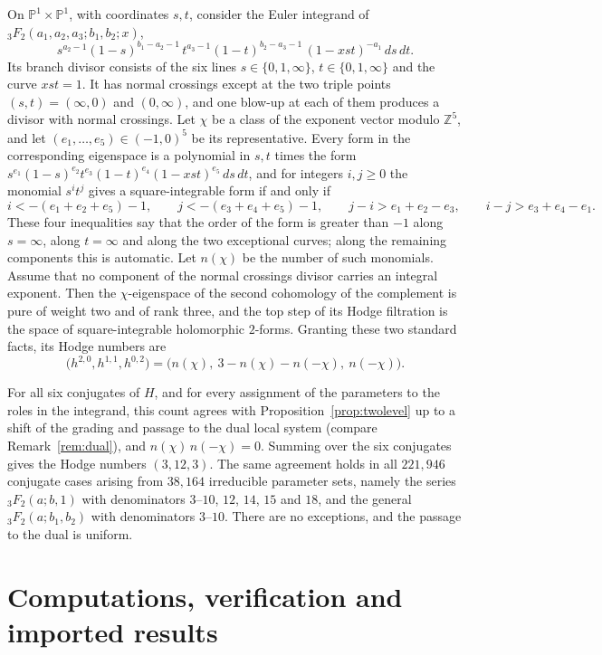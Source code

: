 \documentclass[11pt]{amsart}
\theoremstyle{definition}
\theoremstyle{remark}
\numberwithin{equation}{section}
\newcommand{\Z}{\mathbb{Z}}
\newcommand{\PP}{\mathbb{P}}
\begin{document}
On $\PP^1\times\PP^1$, with coordinates $s,t$, consider the Euler integrand of ${}_3F_2(a_1,a_2,a_3;b_1,b_2;x)$,
\[
s^{a_2-1}(1-s)^{b_1-a_2-1}\,t^{a_3-1}(1-t)^{b_2-a_3-1}\,(1-xst)^{-a_1}\,ds\,dt .
\]
Its branch divisor consists of the six lines $s\in\{0,1,\infty\}$, $t\in\{0,1,\infty\}$ and the curve $xst=1$. It has normal crossings except at the two triple points $(s,t)=(\infty,0)$ and $(0,\infty)$, and one blow-up at each of them produces a divisor with normal crossings. Let $\chi$ be a class of the exponent vector modulo $\Z^5$, and let $(e_1,\dots,e_5)\in(-1,0)^5$ be its representative. Every form in the corresponding eigenspace is a polynomial in $s,t$ times the form $s^{e_1}(1-s)^{e_2}t^{e_3}(1-t)^{e_4}(1-xst)^{e_5}\,ds\,dt$, and for integers $i,j\ge0$ the monomial $s^it^j$ gives a square-integrable form if and only if
\[
i<-(e_1+e_2+e_5)-1,\qquad j<-(e_3+e_4+e_5)-1,\qquad j-i>e_1+e_2-e_3,\qquad i-j>e_3+e_4-e_1 .
\]
These four inequalities say that the order of the form is greater than $-1$ along $s=\infty$, along $t=\infty$ and along the two exceptional curves; along the remaining components this is automatic. Let $n(\chi)$ be the number of such monomials. Assume that no component of the normal crossings divisor carries an integral exponent. Then the $\chi$-eigenspace of the second cohomology of the complement is pure of weight two and of rank three, and the top step of its Hodge filtration is the space of square-integrable holomorphic $2$-forms. Granting these two standard facts, its Hodge numbers are
\[
\big(h^{2,0},h^{1,1},h^{0,2}\big)=\big(n(\chi),\ 3-n(\chi)-n(-\chi),\ n(-\chi)\big).
\]

For all six conjugates of $H$, and for every assignment of the parameters to the roles in the integrand, this count agrees with Proposition~\ref{prop:twolevel} up to a shift of the grading and passage to the dual local system (compare Remark~\ref{rem:dual}), and $n(\chi)\,n(-\chi)=0$. Summing over the six conjugates gives the Hodge numbers $(3,12,3)$. The same agreement holds in all $221{,}946$ conjugate cases arising from $38{,}164$ irreducible parameter sets, namely the series ${}_3F_2(a;b,1)$ with denominators $3$--$10$, $12$, $14$, $15$ and $18$, and the general ${}_3F_2(a;b_1,b_2)$ with denominators $3$--$10$. There are no exceptions, and the passage to the dual is uniform.

\section{Computations, verification and imported results}\label{app:certificates}
\end{document}
